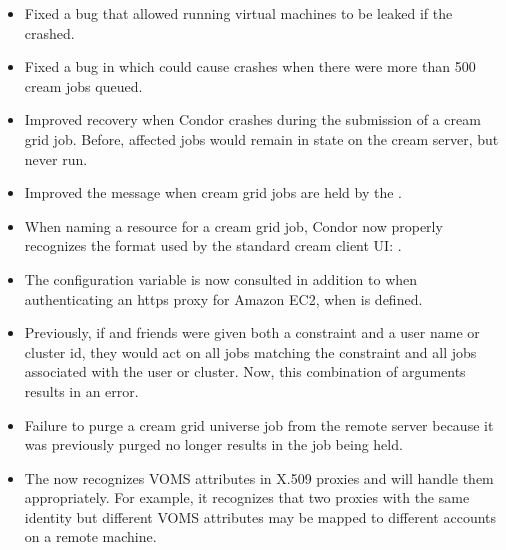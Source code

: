 \begin{itemize}
\item Fixed a bug that allowed running virtual machines to be leaked
if the  crashed.

\item Fixed a bug in  which could cause crashes when
there were more than 500 cream jobs queued.

\item Improved recovery when Condor crashes during the submission of a cream
grid job. Before, affected jobs would remain in  state
on the cream server, but never run.

\item Improved the  message when cream grid jobs are
held by the .

\item When naming a resource for a cream grid job, Condor now properly
recognizes the format used by the standard cream client UI:
.

\item The configuration variable  is now 
consulted in addition to
 when authenticating
an https proxy for Amazon EC2, when  is defined.

\item Previously, if  and friends were given both a constraint
and a user name or cluster id, they would act on all jobs matching the
constraint and all jobs associated with the user or cluster. Now, this
combination of arguments results in an error.

\item Failure to purge a cream grid universe job from the remote server
because it was previously purged no longer results in the job being held.

\item The  now recognizes VOMS attributes in X.509
proxies and will handle them appropriately. For example, it recognizes
that two proxies with the same identity but different VOMS attributes may
be mapped to different accounts on a remote machine.



\end{itemize}
